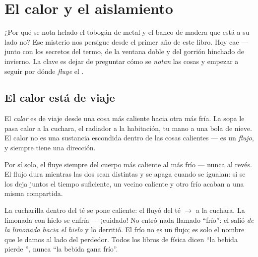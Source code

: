 \chapter{El calor y el aislamiento}\label{ch:g5:heat-and-insulation}

¿Por qué se nota helado el tobogán de metal y el banco de madera que
está a su lado no? Ese misterio nos persigue desde el primer año de
este libro. Hoy cae --- junto con los secretos del termo, de la
ventana doble y del gorrión hinchado de invierno. La clave es dejar de
preguntar cómo se \emph{notan} las cosas y empezar a seguir por dónde
\emph{fluye} el .

\section{El calor está de viaje}

\begin{definition}[El calor]\label{def:g5:heat-and-insulation:heat}
El \emph{calor} es  de viaje desde una cosa más
caliente hacia otra más fría. La sopa le pasa calor a la cuchara, el
radiador a la habitación, tu mano a una bola de nieve. El calor no es
una sustancia escondida dentro de las cosas calientes --- es un
\emph{flujo}, y siempre tiene una dirección.
\end{definition}

\begin{proposition}\label{prop:g5:heat-and-insulation:downhill}
Por sí solo, el  fluye siempre del cuerpo más caliente al más
frío --- nunca al revés. El flujo dura mientras las dos
 sean distintas y se apaga cuando se igualan: si se
los deja juntos el tiempo suficiente, un vecino caliente y otro frío
acaban a una misma  compartida.
\end{proposition}

\begin{example}\label{ex:g5:heat-and-insulation:direction}
La cucharilla dentro del té se pone caliente: el  fluyó del té
$\to$ a la cuchara. La limonada con hielo se enfría --- ¡cuidado! No
entró nada llamado ``frío'': el  salió \emph{de la limonada
hacia el hielo} y lo derritió. El frío no es un flujo; es solo el
nombre que le damos al lado del perdedor. Todos los libros de física
dicen ``la bebida pierde '', nunca ``la bebida gana frío''.
\end{example}

